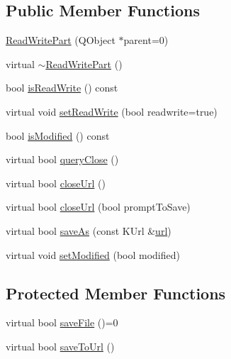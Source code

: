 \subsection*{Public Member Functions}
\begin{DoxyCompactItemize}
\item 
\hyperlink{classKParts_1_1ReadWritePart_a5444a248f62fa73ab6461dbbaed30054}{Read\+Write\+Part} (Q\+Object $\ast$parent=0)
\item 
virtual \hyperlink{classKParts_1_1ReadWritePart_a05e99804f15b4b8941fd026481cc74b2}{$\sim$\+Read\+Write\+Part} ()
\item 
bool \hyperlink{classKParts_1_1ReadWritePart_a1f77bd8acc3596f59cd07fa7918dafb1}{is\+Read\+Write} () const 
\item 
virtual void \hyperlink{classKParts_1_1ReadWritePart_a5b8c2d4b35739c882dc67f0acf8096c2}{set\+Read\+Write} (bool readwrite=true)
\item 
bool \hyperlink{classKParts_1_1ReadWritePart_a61acb87afb71c5cd7dcce295693e22e4}{is\+Modified} () const 
\item 
virtual bool \hyperlink{classKParts_1_1ReadWritePart_acdf38bc8da8b88a6ba38f9a3129d0c77}{query\+Close} ()
\item 
virtual bool \hyperlink{classKParts_1_1ReadWritePart_a45ed4bb6df997d6db0eae0d63f66b050}{close\+Url} ()
\item 
virtual bool \hyperlink{classKParts_1_1ReadWritePart_ac9d11b897ccf15ada8d15dd55eae3e3f}{close\+Url} (bool prompt\+To\+Save)
\item 
virtual bool \hyperlink{classKParts_1_1ReadWritePart_a5b10d70c83095f525b92fa5c9b554826}{save\+As} (const K\+Url \&\hyperlink{classKParts_1_1ReadOnlyPart_a5b8edbf05a338814287496882adde559}{url})
\item 
virtual void \hyperlink{classKParts_1_1ReadWritePart_ae8171d17ef8cf7f51a0607fa8a5df7d0}{set\+Modified} (bool modified)
\end{DoxyCompactItemize}
\subsection*{Protected Member Functions}
\begin{DoxyCompactItemize}
\item 
virtual bool \hyperlink{classKParts_1_1ReadWritePart_a599af24081c3dc1c261c04dce1de4f41}{save\+File} ()=0
\item 
virtual bool \hyperlink{classKParts_1_1ReadWritePart_affb719d6b8951cb1f3986b92db9527fe}{save\+To\+Url} ()
\end{DoxyCompactItemize}
